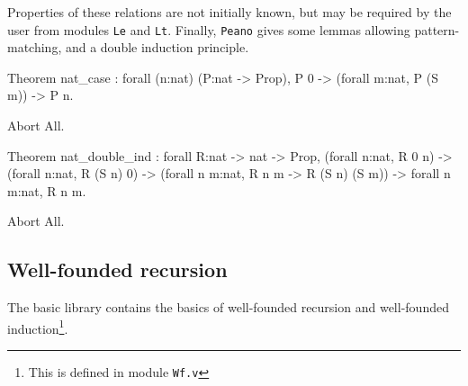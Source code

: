 Properties of these relations are not initially known, but may be
required by the user from modules \verb:Le: and \verb:Lt:.  Finally,
\verb:Peano: gives some lemmas allowing pattern-matching, and a double
induction principle.


\begin{coq_example*}
Theorem nat_case :
 forall (n:nat) (P:nat -> Prop),
 P 0 -> (forall m:nat, P (S m)) -> P n.
\end{coq_example*}
\begin{coq_eval}
Abort All.
\end{coq_eval}
\begin{coq_example*}
Theorem nat_double_ind :
 forall R:nat -> nat -> Prop,
   (forall n:nat, R 0 n) ->
   (forall n:nat, R (S n) 0) ->
   (forall n m:nat, R n m -> R (S n) (S m)) -> forall n m:nat, R n m.
\end{coq_example*}
\begin{coq_eval}
Abort All.
\end{coq_eval}

\subsection{Well-founded recursion}

The basic library contains the basics of well-founded recursion and
well-founded induction\footnote{This is defined in module {\tt Wf.v}}.

